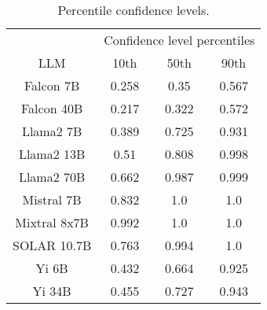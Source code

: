 \begin{table*}
\centering
\begin{tabular}{c|c|c|c}
& \multicolumn{3}{c}{Confidence level percentiles} \\ 
LLM & 10th & 50th & 90th\\ \hline
Falcon 7B & 0.258 & 0.35 & 0.567\\
Falcon 40B & 0.217 & 0.322 & 0.572\\
Llama2 7B & 0.389 & 0.725 & 0.931\\
Llama2 13B & 0.51 & 0.808 & 0.998\\
Llama2 70B & 0.662 & 0.987 & 0.999\\
Mistral 7B & 0.832 & 1.0 & 1.0\\
Mixtral 8x7B & 0.992 & 1.0 & 1.0\\
SOLAR 10.7B & 0.763 & 0.994 & 1.0\\
Yi 6B & 0.432 & 0.664 & 0.925\\
Yi 34B & 0.455 & 0.727 & 0.943\\
\hline
\end{tabular}
\caption{Percentile confidence levels.}
\label{tab:percentile_conf}
\end{table*}
